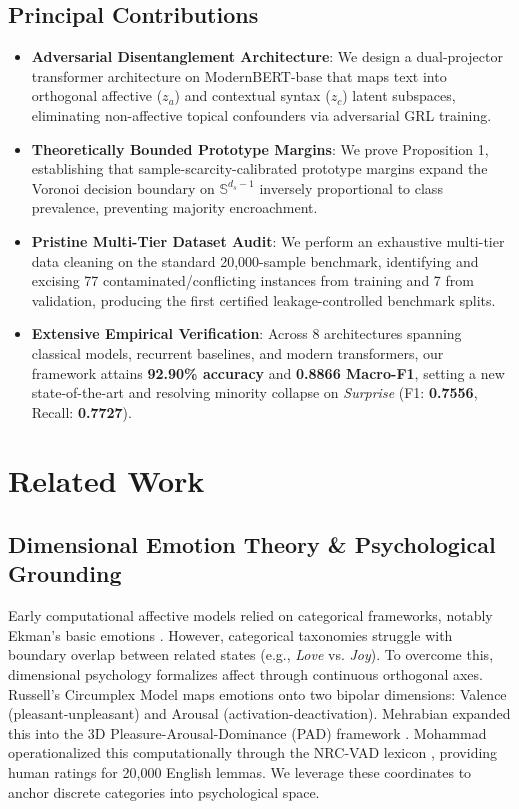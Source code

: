 \documentclass[journal,twocolumn]{article}
\begin{document}
\subsection{Principal Contributions}
\begin{itemize}
    \item \textbf{Adversarial Disentanglement Architecture}: We design a dual-projector transformer architecture on ModernBERT-base that maps text into orthogonal affective ($z_a$) and contextual syntax ($z_c$) latent subspaces, eliminating non-affective topical confounders via adversarial GRL training.
    \item \textbf{Theoretically Bounded Prototype Margins}: We prove Proposition 1, establishing that sample-scarcity-calibrated prototype margins expand the Voronoi decision boundary on $\mathbb{S}^{d_s-1}$ inversely proportional to class prevalence, preventing majority encroachment.
    \item \textbf{Pristine Multi-Tier Dataset Audit}: We perform an exhaustive multi-tier data cleaning on the standard 20,000-sample benchmark, identifying and excising 77 contaminated/conflicting instances from training and 7 from validation, producing the first certified leakage-controlled benchmark splits.
    \item \textbf{Extensive Empirical Verification}: Across 8 architectures spanning classical models, recurrent baselines, and modern transformers, our framework attains \textbf{92.90\% accuracy} and \textbf{0.8866 Macro-F1}, setting a new state-of-the-art and resolving minority collapse on \textit{Surprise} (F1: \textbf{0.7556}, Recall: \textbf{0.7727}).
\end{itemize}

\section{Related Work}
\label{sec:related_work}

\subsection{Dimensional Emotion Theory \& Psychological Grounding}
Early computational affective models relied on categorical frameworks, notably Ekman's basic emotions \cite{ekman1992argument}. However, categorical taxonomies struggle with boundary overlap between related states (e.g., \textit{Love} vs. \textit{Joy}). To overcome this, dimensional psychology formalizes affect through continuous orthogonal axes. Russell's Circumplex Model \cite{russell1980circumplex} maps emotions onto two bipolar dimensions: Valence (pleasant-unpleasant) and Arousal (activation-deactivation). Mehrabian expanded this into the 3D Pleasure-Arousal-Dominance (PAD) framework \cite{mehrabian1996pleasure}. Mohammad operationalized this computationally through the NRC-VAD lexicon \cite{mohammad2018vad}, providing human ratings for 20,000 English lemmas. We leverage these coordinates to anchor discrete categories into psychological space.
\end{document}
